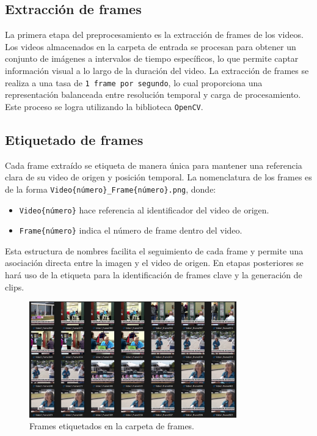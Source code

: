 \subsection{Extracción de frames}

La primera etapa del preprocesamiento es la extracción de frames de los videos. Los videos almacenados en la carpeta de entrada se procesan para obtener un conjunto de imágenes a intervalos de tiempo específicos, lo que permite captar información visual a lo largo de la duración del video. La extracción de frames se realiza a una tasa de \texttt{1 frame por segundo}, lo cual proporciona una representación balanceada entre resolución temporal y carga de procesamiento. Este proceso se logra utilizando la biblioteca \texttt{OpenCV}.

\subsection{Etiquetado de frames}

Cada frame extraído se etiqueta de manera única para mantener una referencia clara de su video de origen y posición temporal. La nomenclatura de los frames es de la forma \texttt{Video\{número\}\_Frame\{número\}.png}, donde:
\begin{itemize}
    \item \texttt{Video\{número\}} hace referencia al identificador del video de origen.
    \item \texttt{Frame\{número\}} indica el número de frame dentro del video.
\end{itemize}

Esta estructura de nombres facilita el seguimiento de cada frame y permite una asociación directa entre la imagen y el video de origen. En etapas posteriores se hará uso de la etiqueta para la identificación de frames clave y la generación de clips.

\begin{figure}[H]
    \centering
    \includegraphics[width=0.80\textwidth]{4/figures/Etiquetado_1.png}
    \caption{Frames etiquetados en la carpeta de frames.}
    \label{fig:convolucion}
\end{figure}

